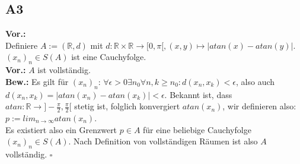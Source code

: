 \documentclass[12pt, a4paper]{article}
\newcommand*{\qed}{\null\nobreak\hfill\ensuremath{\square}}
\newcommand*{\gap}{\text{ }}
\newcommand*{\vor}{\textbf{Vor.:} \gap}
\newcommand*{\bew}{\textbf{Bew.:} \gap}
\begin{document}
\subsection*{A3}
\vor \\ 
Definiere \(A:=(\mathbb{R},d)\) mit \(d:\mathbb{R} \times \mathbb{R} \rightarrow [0,\pi[, (x,y) \mapsto \vert atan(x) - atan(y) \vert\).\\
\({(x_n)}_n \in S(A)\) ist eine Cauchyfolge.\\
\vor \(A\) ist vollständig.\\
\bew Es gilt für \({(x_n)}_n\): \(\forall \epsilon > 0 \exists n_0 \forall n,k \geq n_0 : d (x_n,x_k)< \epsilon\), 
also auch \(d(x_n,x_k) = \vert atan(x_n) - atan(x_k)\vert < \epsilon\). Bekannt ist, dass \\
\(atan: \mathbb{R} \rightarrow ]-\frac{\pi}{2}, \frac{\pi}{2}[\) stetig ist, folglich konvergiert 
\(atan(x_n)\), wir definieren also: \(p:=lim_{n \rightarrow \infty} atan (x_n)\).\\
Es existiert also ein Grenzwert \(p \in A\) für eine beliebige Cauchyfolge \({(x_n)}_n \in S(A)\). Nach 
Definition von vollständigen Räumen ist also \(A\) vollständig. \qed
\end{document}
